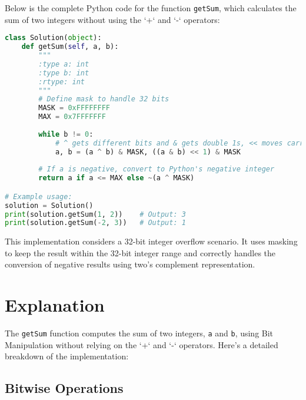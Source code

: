 Below is the complete Python code for the function \texttt{getSum}, which calculates the sum of two integers without using the `+` and `-` operators:

\begin{fullwidth}
\begin{lstlisting}[language=Python]
class Solution(object):
    def getSum(self, a, b):
        """
        :type a: int
        :type b: int
        :rtype: int
        """
        # Define mask to handle 32 bits
        MASK = 0xFFFFFFFF
        MAX = 0x7FFFFFFF
        
        while b != 0:
            # ^ gets different bits and & gets double 1s, << moves carry
            a, b = (a ^ b) & MASK, ((a & b) << 1) & MASK
        
        # If a is negative, convert to Python's negative integer
        return a if a <= MAX else ~(a ^ MASK)

# Example usage:
solution = Solution()
print(solution.getSum(1, 2))    # Output: 3
print(solution.getSum(-2, 3))   # Output: 1
\end{lstlisting}
\end{fullwidth}

This implementation considers a 32-bit integer overflow scenario. It uses masking to keep the result within the 32-bit integer range and correctly handles the conversion of negative results using two's complement representation.

\section*{Explanation}

The \texttt{getSum} function computes the sum of two integers, \texttt{a} and \texttt{b}, using Bit Manipulation without relying on the `+` and `-` operators. Here's a detailed breakdown of the implementation:

\subsection*{Bitwise Operations}

